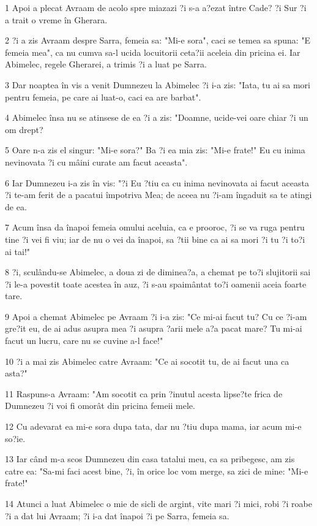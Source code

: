 \par 1 Apoi a plecat Avraam de acolo spre miazazi ?i s-a a?ezat între Cade? ?i Sur ?i a trait o vreme în Gherara.
\par 2 ?i a zis Avraam despre Sarra, femeia sa: "Mi-e sora", caci se temea sa spuna: "E femeia mea", ca nu cumva sa-l ucida locuitorii ceta?ii aceleia din pricina ei. Iar Abimelec, regele Gherarei, a trimis ?i a luat pe Sarra.
\par 3 Dar noaptea în vis a venit Dumnezeu la Abimelec ?i i-a zis: "Iata, tu ai sa mori pentru femeia, pe care ai luat-o, caci ea are barbat".
\par 4 Abimelec însa nu se atinsese de ea ?i a zis: "Doamne, ucide-vei oare chiar ?i un om drept?
\par 5 Oare n-a zis el singur: "Mi-e sora?" Ba ?i ea mia zis: "Mi-e frate!" Eu cu inima nevinovata ?i cu mâini curate am facut aceasta".
\par 6 Iar Dumnezeu i-a zis în vis: "?i Eu ?tiu ca cu inima nevinovata ai facut aceasta ?i te-am ferit de a pacatui împotriva Mea; de aceea nu ?i-am îngaduit sa te atingi de ea.
\par 7 Acum însa da înapoi femeia omului aceluia, ca e prooroc, ?i se va ruga pentru tine ?i vei fi viu; iar de nu o vei da înapoi, sa ?tii bine ca ai sa mori ?i tu ?i to?i ai tai!"
\par 8 ?i, sculându-se Abimelec, a doua zi de diminea?a, a chemat pe to?i slujitorii sai ?i le-a povestit toate acestea în auz, ?i s-au spaimântat to?i oamenii aceia foarte tare.
\par 9 Apoi a chemat Abimelec pe Avraam ?i i-a zis: "Ce mi-ai facut tu? Cu ce ?i-am gre?it eu, de ai adus asupra mea ?i asupra ?arii mele a?a pacat mare? Tu mi-ai facut un lucru, care nu se cuvine a-l face!"
\par 10 ?i a mai zis Abimelec catre Avraam: "Ce ai socotit tu, de ai facut una ca asta?"
\par 11 Raspuns-a Avraam: "Am socotit ca prin ?inutul acesta lipse?te frica de Dumnezeu ?i voi fi omorât din pricina femeii mele.
\par 12 Cu adevarat ea mi-e sora dupa tata, dar nu ?tiu dupa mama, iar acum mi-e so?ie.
\par 13 Iar când m-a scos Dumnezeu din casa tatalui meu, ca sa pribegesc, am zis catre ea: "Sa-mi faci acest bine, ?i, în orice loc vom merge, sa zici de mine: "Mi-e frate!"
\par 14 Atunci a luat Abimelec o mie de sicli de argint, vite mari ?i mici, robi ?i roabe ?i a dat lui Avraam; ?i i-a dat înapoi ?i pe Sarra, femeia sa.
